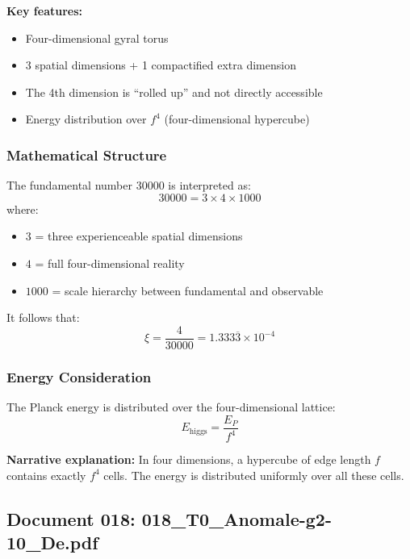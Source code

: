 	\textbf{Key features:}
	\begin{itemize}
		\item Four-dimensional gyral torus
		\item 3 spatial dimensions + 1 compactified extra dimension
		\item The 4th dimension is \enquote{rolled up} and not directly accessible
		\item Energy distribution over $f^4$ (four-dimensional hypercube)
	\end{itemize}
	
	\subsubsection{Mathematical Structure}
	
	The fundamental number 30000 is interpreted as:
	\begin{equation}
		30000 = 3 \times 4 \times 1000
	\end{equation}
	where:
	\begin{itemize}
		\item $3$ = three experienceable spatial dimensions
		\item $4$ = full four-dimensional reality
		\item $1000$ = scale hierarchy between fundamental and observable
	\end{itemize}
	
	It follows that:
	\begin{equation}
		\boxed{\xi = \frac{4}{30000} = 1.333\overline{3} \times 10^{-4}}
	\end{equation}
	
	\subsubsection{Energy Consideration}
	
	The Planck energy is distributed over the four-dimensional lattice:
	\begin{equation}
		E_{\text{higgs}} = \frac{E_P}{f^4}
	\end{equation}
	
	\textbf{Narrative explanation:} In four dimensions, a hypercube of edge length $f$ contains exactly $f^4$ cells. The energy is distributed uniformly over all these cells.
	
	\subsection{Document 018: 018\_T0\_Anomale-g2-10\_De.pdf}
	
